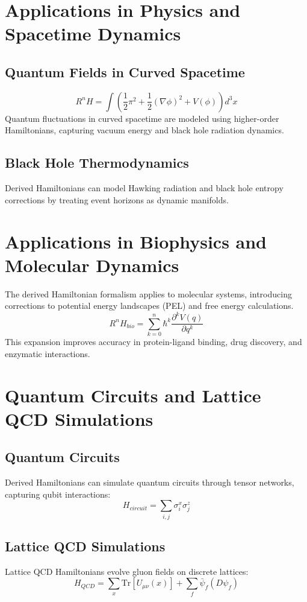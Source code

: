 \documentclass{article}
\begin{document}
\section{Applications in Physics and Spacetime Dynamics}
\subsection{Quantum Fields in Curved Spacetime}
\[
R^nH = \int \left( \frac{1}{2} \pi^2 + \frac{1}{2} (\nabla \phi)^2 + V(\phi) \right) d^3x
\]
Quantum fluctuations in curved spacetime are modeled using higher-order Hamiltonians, capturing vacuum energy and black hole radiation dynamics.

\subsection{Black Hole Thermodynamics}
Derived Hamiltonians can model Hawking radiation and black hole entropy corrections by treating event horizons as dynamic manifolds.

\section{Applications in Biophysics and Molecular Dynamics}
The derived Hamiltonian formalism applies to molecular systems, introducing corrections to potential energy landscapes (PEL) and free energy calculations.
\[
R^nH_{bio} = \sum_{k=0}^n \hbar^k \frac{\partial^k V(q)}{\partial q^k}
\]
This expansion improves accuracy in protein-ligand binding, drug discovery, and enzymatic interactions.

\section{Quantum Circuits and Lattice QCD Simulations}
\subsection{Quantum Circuits}
Derived Hamiltonians can simulate quantum circuits through tensor networks, capturing qubit interactions:
\[
H_{circuit} = \sum_{i,j} \sigma_i^x \sigma_j^z
\]

\subsection{Lattice QCD Simulations}
Lattice QCD Hamiltonians evolve gluon fields on discrete lattices:
\[
H_{QCD} = \sum_{x} \text{Tr}[U_{\mu\nu}(x)] + \sum_{f} \bar{\psi}_f (D \psi_f)
\]
\end{document}
